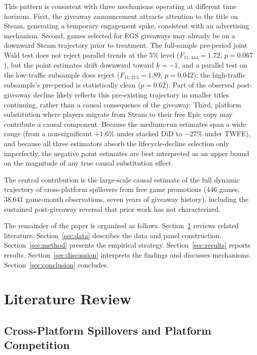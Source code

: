 \documentclass[11pt]{article}
\begin{document}
This pattern is consistent with three mechanisms operating at different time horizons.
First, the giveaway announcement attracts attention to the title on Steam, generating
a temporary engagement spike, consistent with an advertising mechanism.
Second, games selected for EGS giveaways may already be on a downward Steam
trajectory prior to treatment. The full-sample pre-period joint Wald test does not
reject parallel trends at the 5\% level ($F_{11,444}=1.72$, $p=0.067$), but the
point estimates drift downward toward $k=-1$, and a parallel test on the low-traffic
subsample does reject ($F_{11,213}=1.89$, $p=0.042$); the high-traffic subsample's
pre-period is statistically clean ($p=0.62$). Part of the observed post-giveaway
decline likely reflects this pre-existing trajectory in smaller titles continuing,
rather than a causal consequence of the giveaway.
Third, platform substitution where players migrate from Steam to their free
Epic copy may contribute a causal component. Because the medium-run
estimates span a wide range (from a non-significant $+1.6\%$ under stacked DiD to
$-27\%$ under TWFE), and because all three estimators absorb the lifecycle-decline
selection only imperfectly, the negative point estimates are best interpreted as an
upper bound on the magnitude of any true causal substitution effect.

The central contribution is the large-scale causal estimate of the full
dynamic trajectory of cross-platform spillovers from free game promotions (446 games,
38{,}641 game-month observations, seven years of giveaway history), including the
sustained post-giveaway reversal that prior work has not characterized.

The remainder of the paper is organized as follows. Section~\ref{sec:lit} reviews
related literature. Section~\ref{sec:data} describes the data and panel construction.
Section~\ref{sec:method} presents the empirical strategy. Section~\ref{sec:results}
reports results. Section~\ref{sec:discussion} interprets the findings and discusses
mechanisms. Section~\ref{sec:conclusion} concludes.

\section{Literature Review}
\label{sec:lit}

\subsection{Cross-Platform Spillovers and Platform Competition}
\end{document}
